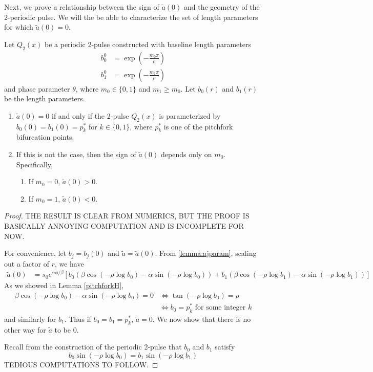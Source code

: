 \documentclass[thesis.tex]{subfiles}
\begin{document}
Next, we prove a relationship between the sign of $\tilde{a}(0)$ and the geometry of the 2-periodic pulse. We will the be able to characterize the set of length parameters for which $\tilde{a}(0) = 0$.

\begin{lemma}\label{lemma:tildea0char}
Let $Q_2(x)$ be a periodic 2-pulse constructed with baseline length parameters 
\begin{align*}
b_0^0 &= \exp\left(-\frac{m_0 \pi}{\rho}\right) \\
b_1^0 &= \exp\left(-\frac{m_1 \pi}{\rho}\right)
\end{align*}
and phase parameter $\theta$, where $m_0 \in \{0, 1\}$ and $m_1 \geq m_0$. Let $b_0(r)$ and $b_1(r)$ be the length parameters.
\begin{enumerate}
	\item $\tilde{a}(0) = 0$ if and only if the 2-pulse $Q_2(x)$ is parameterized by $b_0(0) = b_1(0) = p_k^*$ for $k \in \{0, 1\}$, where $p_k^*$ is one of the pitchfork bifurcation points.
	\item If this is not the case, then the sign of $\tilde{a}(0)$ depends only on $m_0$. Specifically,
	\begin{enumerate}
		\item If $m_0 = 0$, $\tilde{a}(0) > 0$.
		\item If $m_0 = 1$, $\tilde{a}(0) < 0$.
	\end{enumerate}
\end{enumerate}
\begin{proof}
THE RESULT IS CLEAR FROM NUMERICS, BUT THE PROOF IS BASICALLY ANNOYING COMPUTATION AND IS INCOMPLETE FOR NOW.

For convenience, let $b_j = b_j(0)$ and $\tilde{a} = \tilde{a}(0)$. From \cref{lemma:ajparam}, scaling out a factor of $r$, we have
\begin{align*}
\tilde{a}(0) &= s_0 e^{\alpha \phi/\beta}\left[ b_0 ( \beta \cos(-\rho \log b_0 ) - \alpha \sin (-\rho \log b_0 ))  + b_1 ( \beta \cos(-\rho \log b_1 ) - \alpha \sin (-\rho \log b_1 )) \right]
\end{align*}
As we showed in Lemma \ref{pitchforkH}, 
\begin{align*}
\beta \cos(-\rho \log b_0 ) - \alpha \sin (-\rho \log b_0 ) = 0 &\iff \tan(-\rho \log b_0 ) = \rho \\
&\iff b_0 = p_k^* \text{ for some integer }k
\end{align*}
and similarly for $b_1$. Thus if $b_0 = b_1 = p_k^*$, $\tilde{a} = 0$. We now show that there is no other way for $\tilde{a}$ to be 0.

Recall from the construction of the periodic 2-pulse that $b_0$ and $b_1$ satisfy
\begin{equation}\label{b0b1relation}
b_0 \sin (-\rho \log b_0) = b_1 \sin(-\rho \log b_1)
\end{equation}
TEDIOUS COMPUTATIONS TO FOLLOW.

\end{proof}
\end{lemma}
\end{document}
